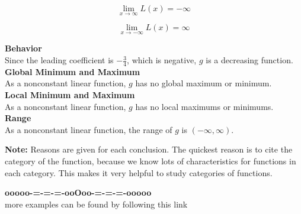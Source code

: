 \documentclass{ximera}
\begin{document}
\begin{example}
\[
\lim\limits_{x \to \infty} L(x) = -\infty
\]

\[
\lim\limits_{x \to -\infty} L(x) = \infty
\]





\textbf{Behavior} \\

Since the leading coefficient is $-\frac{3}{4}$, which is negative, $g$ is a decreasing function. \\



\textbf{Global Minimum and Maximum} \\

As a nonconstant linear function, $g$ has no global maximum or minimum. \\



\textbf{Local Minimum and Maximum} \\

As a nonconstant linear function, $g$ has no local maximums or minimums. \\



\textbf{Range} \\

As a nonconstant linear function, the range of $g$ is $(-\infty, \infty)$. \\



\end{example}

\textbf{Note:} Reasons are given for each conclusion.  The quickest reason is to cite the category of the function, because we know lots of characteristics for functions in each category.  This makes it very helpful to study categories of functions. \\






\begin{onlineOnly}
\begin{center}
\textbf{\textcolor{green!50!black}{ooooo-=-=-=-ooOoo-=-=-=-ooooo}} \\

more examples can be found by following this link\\ 

\end{center}
\end{onlineOnly}
\end{document}
